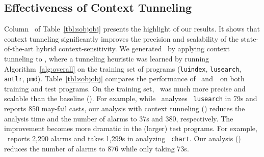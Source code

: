 


\subsection{Effectiveness of Context Tunneling}\label{sec:effectiveness-tunneling}

Column \bonesobjHT~of Table~\ref{tbl:sobjobj} presents the highlight
of our results. It shows that context tunneling significantly improves
the precision and scalability of the state-of-the-art hybrid
context-sensitivity.  We generated \onesobjHT~by applying context
tunneling to \onesobjH, where a tunneling heuristic was learned by
running Algorithm~\ref{alg:overall} on the training set of programs
({\tt luindex}, {\tt lusearch}, {\tt antlr}, {\tt pmd}).
Table~\ref{tbl:sobjobj} compares the performance of
\onesobjHT~and~\onesobjH~on both training and test programs.  On the
training set, \onesobjHT~was much more precise and scalable than the
baseline (\onesobjH).  For example, while \onesobjH~analyzes {\tt
  lusearch} in 79s and reports 850 may-fail casts, our analysis with
context tunneling (\onesobjHT) reduces the analysis time and the
number of alarms to 37s and 380, respectively. The improvement
becomes more dramatic in the (larger) test programs. For example,
\onesobjH~reports 2,290 alarms and takes 1,299s in analyzing {\tt
  chart}. Our analysis (\onesobjHT) reduces the number of alarms to
876 while only taking 73s.


